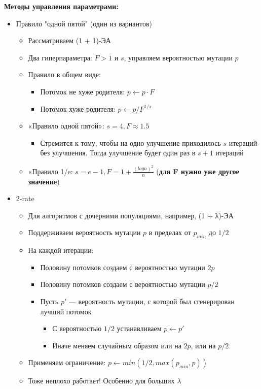 \textbf{Методы управления параметрами:}
\begin{itemize}
    \item Правило "одной пятой" (один из вариантов)
    \begin{itemize}
        \item Рассматриваем (1 + 1)-ЭА
        \item Два гиперпараметра: $F > 1$ и $s$, управляем вероятностью мутации $p$
        \item Правило в общем виде:
        \begin{itemize}
            \item Потомок не хуже родителя: $p ← p · F$ 
            \item Потомок хуже родителя: $p ← p/F^{1/s}$
        \end{itemize}
        \item «Правило одной пятой»: $s= 4, F ≈ 1.5$
        \begin{itemize}
            \item Стремится к тому, чтобы на одно улучшение приходилось $s$ итераций без улучшения. Тогда улучшение будет один раз в $s + 1$ итераций
        \end{itemize}
        \item «Правило 1/e: $s= e-1, F = 1 + \frac{(logn)^2}{n}$ (\textbf{для F нужно уже другое значение})
    \end{itemize}
    \item 2-rate
    \begin{itemize}
        \item Для алгоритмов с дочерними популяциями, например, (1 + λ)-ЭА 
        \item Поддерживаем вероятность мутации $p$ в пределах от $p_{min}$ до $1/2$
        \item На каждой итерации:
        \begin{itemize}
            \item Половину потомков создаем с вероятностью мутации $2p$
            \item Половину потомков создаем с вероятностью мутации $p/2$
            \item Пусть $p′$ — вероятность мутации, с которой был сгенерирован лучший потомок
            \begin{itemize}
                \item С вероятностью $1/2$ устанавливаем $p ← p′$
                \item Иначе меняем случайным образом или на $2p$, или на $p/2$
            \end{itemize}
        \end{itemize}
        \item Применяем ограничение: $p ← min(1/2, max(p_{min}, p ))$
        \item Тоже неплохо работает! Особенно для больших $λ$    
    \end{itemize}
\end{itemize}


